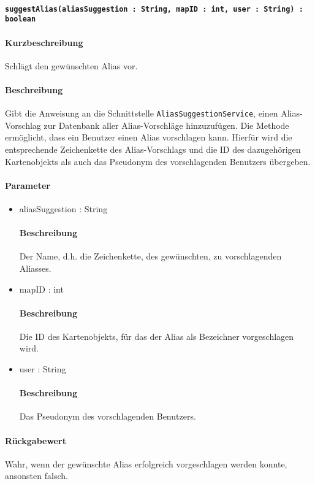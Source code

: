 \paragraph*{\texttt{suggestAlias(aliasSuggestion : String, mapID : int, user : String) : boolean}}%
\paragraph*{Kurzbeschreibung}
Schlägt den gewünschten Alias vor.
\paragraph*{Beschreibung}
Gibt die Anweisung an die Schnittstelle \texttt{AliasSuggestionService}, einen Alias-Vorschlag zur Datenbank aller Alias-Vorschläge hinzuzufügen.
Die Methode ermöglicht, dass ein Benutzer einen Alias vorschlagen kann. 
Hierfür wird die entsprechende Zeichenkette des Alias-Vorschlags und die ID des dazugehörigen Kartenobjekts als auch das Pseudonym des vorschlagenden Benutzers übergeben.
\paragraph*{Parameter}
\begin{itemize}
	\item aliasSuggestion : String
		\paragraph*{Beschreibung}
		Der Name, d.h. die Zeichenkette, des gewünschten, zu vorschlagenden Aliasses.
	\item mapID : int
		\paragraph*{Beschreibung}
		Die ID des Kartenobjekts, für das der Alias als Bezeichner vorgeschlagen wird.
	\item user : String
		\paragraph*{Beschreibung}
		Das Pseudonym des vorschlagenden Benutzers.
\end{itemize}
\paragraph*{Rückgabewert}
Wahr, wenn der gewünschte Alias erfolgreich vorgeschlagen werden konnte, ansonsten falsch.
